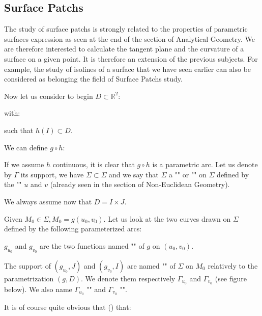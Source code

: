 {	\pagebreak
	\subsection{Surface Patchs}
	The study of surface patchs is strongly related to the properties of parametric surfaces expression as seen at the end of the section of Analytical Geometry. We are therefore interested to calculate the tangent plane and the curvature of a surface on a given point. It is therefore an extension of the previous subjects. For example, the study of isolines of a surface that we have seen earlier can also be considered as belonging the field of Surface Patchs study.
	 
	Now let us consider to begin $D \subset \mathbb{R}^2$:
	
	with:
	
	such that $h(I)\subset D$.

	We can define $g\circ h$:
	
	If we assume $h$ continuous, it is clear that $g\circ h$ is a parametric arc. Let us denote by $\Gamma$ its support, we have $\Sigma \subset \Sigma$ and we say that $\Sigma$ a "" or "" on $\Sigma$ defined by the "" $u$ and $v$ (already seen in the section of Non-Euclidean Geometry).
	
	\begin{tcolorbox}[title=Remark,colframe=black,arc=10pt]
	We always assume now that $D=I\times J$.
	\end{tcolorbox}
	Given $M_0 \in \Sigma, M_0=g(u_0,v_0)$. Let us look at the two curves drawn on $\Sigma$ defined by the following parameterized arcs:
	
	$g_{u_0}$ and $g_{v_0}$ are the two functions named "" of $g$ on $(u_0,v_0)$.
	
	The support of $(g_{u_0},J)$ and $(g_{v_0},I)$ are named "" of $\Sigma$ on $M_0$ relatively to the parametrization $(g,D)$. We denote them  respectively $\Gamma_{u_0}$ and $\Gamma_{v_0}$ (see figure below). We also name $\Gamma_{u_0}$ "" and $\Gamma_{v_0}$ "".
	
	It is of course quite obvious that () that:
	
}
